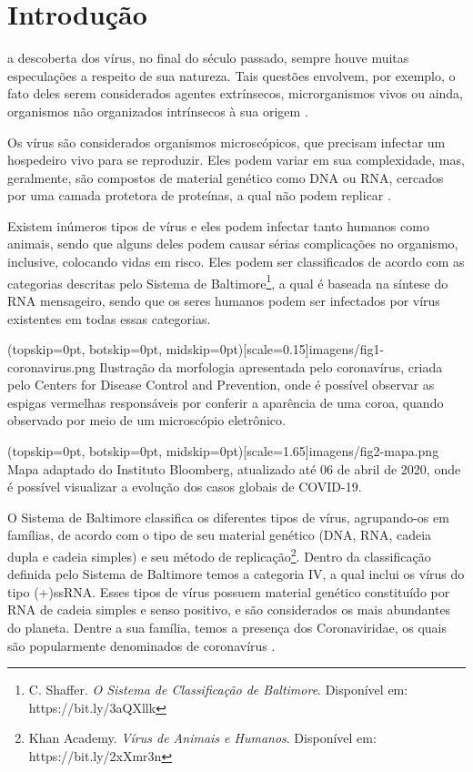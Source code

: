\documentclass{ieeeaccess}
\begin{document}
\titlepgskip=-15pt

\maketitle

\section{Introdução}

\label{sec:introduction}  a descoberta dos vírus, no final do século passado, sempre houve muitas especulações a respeito de sua natureza. Tais questões envolvem, por exemplo, o fato deles serem considerados agentes extrínsecos, microrganismos vivos ou ainda, organismos não organizados intrínsecos à sua origem \cite{b1}. 

Os vírus são considerados organismos microscópicos, que precisam infectar um hospedeiro vivo para se reproduzir. Eles podem variar em sua complexidade, mas, geralmente, são compostos de material genético como DNA ou RNA, cercados por uma camada protetora de proteínas, a qual não podem replicar \cite{b2}.

Existem inúmeros tipos de vírus e eles podem infectar tanto humanos como  animais, sendo que alguns deles podem causar sérias complicações no organismo, inclusive, colocando vidas em risco. Eles podem ser classificados de acordo com as categorias descritas pelo Sistema de Baltimore\footnote{C. Shaffer. \textit{O Sistema de Classificação de Baltimore}. Disponível em: https://bit.ly/3aQXllk}, a qual é baseada na síntese do RNA mensageiro, sendo que os seres humanos podem ser infectados por vírus existentes em todas essas categorias. 

\Figure[t!](topskip=0pt, botskip=0pt, midskip=0pt)[scale=0.15]{imagens/fig1-coronavirus.png}
{Ilustração da morfologia apresentada pelo coronavírus, criada pelo Centers for Disease Control and Prevention, onde é possível observar as espigas vermelhas responsáveis por conferir a aparência de uma coroa, quando observado por meio de um microscópio eletrônico.\label{fig1}}

\Figure[t!](topskip=0pt, botskip=0pt, midskip=0pt)[scale=1.65]{imagens/fig2-mapa.png}
{Mapa adaptado do Instituto Bloomberg, atualizado até 06 de abril de 2020, onde é possível visualizar a evolução dos casos globais de COVID-19.\label{fig2}}

O Sistema de Baltimore classifica os diferentes tipos de vírus, agrupando-os em famílias, de acordo com o tipo de seu material genético (DNA, RNA, cadeia dupla e cadeia simples) e seu método de replicação\footnote{Khan Academy. \textit{Vírus de Animais e Humanos}. Disponível em: https://bit.ly/2xXmr3n}. Dentro da classificação definida pelo Sistema de Baltimore temos a categoria IV, a qual inclui os vírus do tipo (+)ssRNA. Esses tipos de vírus possuem material genético constituído por RNA de cadeia simples e senso positivo, e são considerados os mais abundantes do planeta. Dentre a sua família, temos a presença dos Coronaviridae, os quais são popularmente denominados de coronavírus \cite{b5}. 
\end{document}
